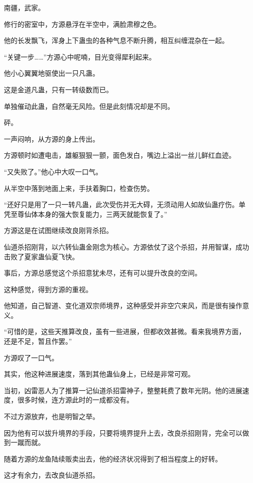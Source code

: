
\begin{this_body}

南疆，武家。

修行的密室中，方源悬浮在半空中，满脸肃穆之色。

他的长发飘飞，浑身上下蛊虫的各种气息不断升腾，相互纠缠混杂在一起。

“关键一步……”方源心中呢喃，目光变得犀利起来。

他小心翼翼地驱使出一只凡蛊。

这是金道凡蛊，只有一转级数而已。

单独催动此蛊，自然毫无风险。但是此刻情况却是不同。

砰。

一声闷响，从方源的身上传出。

方源顿时如遭电击，雄躯狠狠一颤，面色发白，嘴边上溢出一丝儿鲜红血迹。

“又失败了。”他心中大叹一口气。

从半空中落到地面上来，手扶着胸口，检查伤势。

“还好只是用了一只一转凡蛊，此次受伤并无大碍，无须动用人如故仙蛊疗伤。单凭至尊仙体本身的强大恢复能力，三两天就能恢复了。”

方源这是在试图继续改良刚背杀招。

仙道杀招刚背，以六转仙蛊金刚念为核心。方源依仗了这个杀招，并用智谋，成功击败了夏家蛊仙夏飞快。

事后，方源总感觉这个杀招意犹未尽，还有可以提升改良的空间。

这种感觉，得到方源的重视。

他知道，自己智道、变化道双宗师境界，这种感受并非空穴来风，而是很有操作意义。

“可惜的是，这些天推算改良，虽有一些进展，但都收效甚微。看来我境界方面，还是不足，暂且作罢。”

方源叹了一口气。

其实，他这种进展速度，落到其他蛊仙身上，已经是非常可观。

当初，凶雷恶人为了推算一记仙道杀招雷神子，整整耗费了数年光阴。他的进展速度，很多时候，连方源此时的一成都没有。

不过方源放弃，也是明智之举。

因为他有可以拔升境界的手段，只要将境界提升上去，改良杀招刚背，完全可以做到一蹴而就。

随着方源的龙鱼陆续贩卖出去，他的经济状况得到了相当程度上的好转。

这才有余力，去改良仙道杀招。


\end{this_body}
